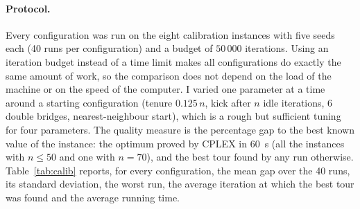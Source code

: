 \documentclass[11pt,a4paper]{article}
\begin{document}
\paragraph{Protocol.}
Every configuration was run on the eight calibration instances with five seeds each (40 runs
per configuration) and a budget of $50\,000$ iterations. Using an iteration budget instead of
a time limit makes all configurations do exactly the same amount of work, so the comparison
does not depend on the load of the machine or on the speed of the computer. I varied one
parameter at a time around a starting configuration (tenure $0.125\,n$, kick after $n$ idle
iterations, 6 double bridges, nearest-neighbour start), which is a rough but sufficient
tuning for four parameters. The quality measure is the percentage gap to the best known value
of the instance: the optimum proved by CPLEX in 60~s (all the instances with $n\le50$ and one
with $n=70$), and the best tour found by any run otherwise. Table~\ref{tab:calib} reports,
for every configuration, the mean gap over the 40 runs, its standard deviation, the worst run,
the average iteration at which the best tour was found and the average running time.

\begin{table}[htbp]\centering\small
\caption{Calibration of the tabu search (8 instances $\times$ 5 seeds per configuration,
$50\,000$ iterations each). Gap in \% to the best known value: mean over the 40 runs,
standard deviation and worst run; average iteration at which the best tour was found.}
\label{tab:calib}

\end{table}
\end{document}
